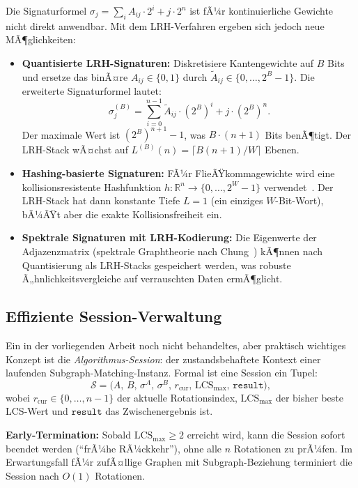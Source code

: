 ﻿\documentclass[a4paper,12pt]{article}
\theoremstyle{definition}
\begin{document}
Die Signaturformel $\sigma_j = \sum_{i} A_{ij} \cdot 2^i + j \cdot 2^n$ ist fÃ¼r
kontinuierliche Gewichte nicht direkt anwendbar. Mit dem LRH-Verfahren ergeben sich
jedoch neue MÃ¶glichkeiten:

\begin{itemize}
  \item \textbf{Quantisierte LRH-Signaturen:} Diskretisiere Kantengewichte auf
        $B$ Bits und ersetze das binÃ¤re $A_{ij} \in \{0,1\}$ durch
        $\tilde{A}_{ij} \in \{0,\ldots,2^B-1\}$. Die erweiterte Signaturformel lautet:
        \[
          \sigma_j^{(B)} = \sum_{i=0}^{n-1} \tilde{A}_{ij} \cdot (2^B)^i + j \cdot (2^B)^n.
        \]
        Der maximale Wert ist $(2^B)^{n+1} - 1$, was $B \cdot (n+1)$ Bits benÃ¶tigt.
        Der LRH-Stack wÃ¤chst auf $L^{(B)}(n) = \lceil B(n+1)/W \rceil$ Ebenen.

  \item \textbf{Hashing-basierte Signaturen:} FÃ¼r FlieÃŸkommagewichte wird eine
        kollisionsresistente Hashfunktion $h: \mathbb{R}^n \to \{0,\ldots,2^W-1\}$
        verwendet~\cite{indyk1998}. Der LRH-Stack hat dann konstante Tiefe $L=1$
        (ein einziges $W$-Bit-Wort), bÃ¼ÃŸt aber die exakte Kollisionsfreiheit ein.

  \item \textbf{Spektrale Signaturen mit LRH-Kodierung:} Die Eigenwerte der
        Adjazenzmatrix (spektrale Graphtheorie nach Chung~\cite{chung1997}) kÃ¶nnen
        nach Quantisierung als LRH-Stacks gespeichert werden, was robuste
        Ã„hnlichkeitsvergleiche auf verrauschten Daten ermÃ¶glicht.
\end{itemize}

\subsection{Effiziente Session-Verwaltung}

Ein in der vorliegenden Arbeit noch nicht behandeltes, aber praktisch wichtiges Konzept
ist die \emph{Algorithmus-Session}: der zustandsbehaftete Kontext einer laufenden
Subgraph-Matching-Instanz. Formal ist eine Session ein Tupel:
\[
  \mathcal{S} = \bigl(A,\, B,\, \sigma^A,\, \sigma^B,\, r_{\mathrm{cur}},\,
                \mathrm{LCS}_{\max},\, \mathtt{result}\bigr),
\]
wobei $r_{\mathrm{cur}} \in \{0,\ldots,n-1\}$ der aktuelle Rotationsindex,
$\mathrm{LCS}_{\max}$ der bisher beste LCS-Wert und $\mathtt{result}$ das
Zwischen\-er\-gebnis ist.

\textbf{Early-Termination:} Sobald $\mathrm{LCS}_{\max} \geq 2$ erreicht wird,
kann die Session sofort beendet werden (``frÃ¼he RÃ¼ckkehr''), ohne alle $n$ Rotationen
zu prÃ¼fen. Im Erwartungsfall fÃ¼r zufÃ¤llige Graphen mit Subgraph-Beziehung terminiert
die Session nach $O(1)$ Rotationen.
\end{document}
